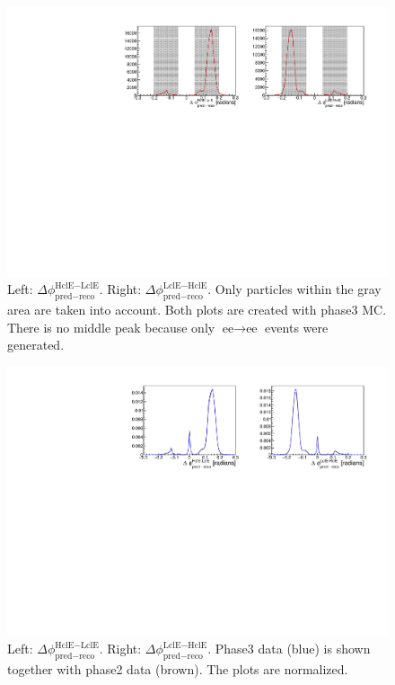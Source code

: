 \documentclass[a4paper,11pt,twosided,final,german,openbib,pdftex,listof=totoc,bibliography=totoc]{scrbook}
\begin{document}
\begin{appendix}
\begin{figure}[h!]
	\centering
	\includegraphics[width=\textwidth]{Plots/master3/hb2b_MCP3.pdf}
	\caption[b2bClusterPhi - clusterPhi For Phase3 MC]{Left: $\Delta \phi _{\textrm{pred} - \textrm{reco}}^{\textrm{HclE}-\textrm{LclE}}$. Right:  $\Delta \phi _{\textrm{pred} - \textrm{reco}}^{\textrm{LclE}-\textrm{HclE}}$. Only particles within the gray area are taken into account. Both plots are created with phase3 MC. There is no middle peak because only $\textrm{ee} \rightarrow \textrm{ee}$ events were generated.}
	\label{fig:b2bMC3}
\end{figure}










\begin{figure}[h!]
	\centering
	\includegraphics[width=\textwidth]{Plots/comp/cb2b.pdf}
	\caption[Normalized b2bClusterPhi - clusterPhi For Phase2 And Phase3 Data]{Left: $\Delta \phi _{\textrm{pred} - \textrm{reco}}^{\textrm{HclE}-\textrm{LclE}}$. Right:  $\Delta \phi _{\textrm{pred} - \textrm{reco}}^{\textrm{LclE}-\textrm{HclE}}$. Phase3 data (blue) is shown together with phase2 data (brown). The plots are normalized.}
	\label{fig:Cb2bData}
\end{figure}






\end{appendix}
\end{document}
